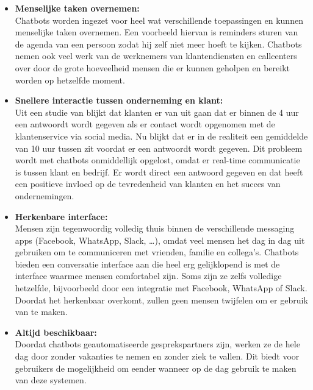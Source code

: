 \begin{itemize}
    \item \textbf{Menselijke taken overnemen:} \\
    
    Chatbots worden ingezet voor heel wat verschillende toepassingen en kunnen menselijke taken overnemen. Een voorbeeld hiervan is reminders sturen van de agenda van een persoon zodat hij zelf niet meer hoeft te kijken. Chatbots nemen ook veel werk van de werknemers van klantendiensten en callcenters over door de grote hoeveelheid mensen die er kunnen geholpen en bereikt worden op hetzelfde moment. \\
    
    \item \textbf{Snellere interactie tussen onderneming en klant:} \\
    
    Uit een studie van \textcite{Social2016} blijkt dat klanten er van uit gaan dat er binnen de 4 uur een antwoordt wordt gegeven als er contact wordt opgenomen met de klantenservice via social media. Nu blijkt dat er in de realiteit een gemiddelde van 10 uur tussen zit voordat er een antwoordt wordt gegeven. Dit probleem wordt met chatbots onmiddellijk opgelost, omdat er real-time communicatie is tussen klant en bedrijf. Er wordt direct een antwoord gegeven en dat heeft een positieve invloed op de tevredenheid van klanten en het succes van ondernemingen. \\
    
    \item \textbf{Herkenbare interface:} \\
    
    Mensen zijn tegenwoordig volledig thuis binnen de verschillende messaging apps (Facebook, WhatsApp, Slack, …), omdat veel mensen het dag in dag uit gebruiken om te communiceren met vrienden, familie en collega’s. Chatbots bieden een conversatie interface aan die heel erg gelijklopend is met de interface waarmee mensen comfortabel zijn. Soms zijn ze zelfs volledige hetzelfde, bijvoorbeeld door een integratie met Facebook, WhatsApp of Slack. Doordat het herkenbaar overkomt, zullen geen mensen twijfelen om er gebruik van te maken. \\
    
    \item \textbf{Altijd beschikbaar:} \\
    
    Doordat chatbots geautomatiseerde gesprekspartners zijn, werken ze de hele dag door zonder vakanties te nemen en zonder ziek te vallen. Dit biedt voor gebruikers de mogelijkheid om eender wanneer op de dag gebruik te maken van deze systemen. \\
    

\end{itemize}
